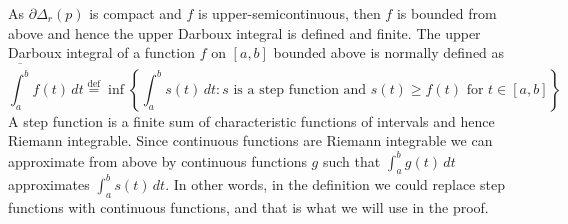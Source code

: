 \documentclass[12pt,openany]{book}
\theoremstyle{plain}
\theoremstyle{remark}
\theoremstyle{definition}
\theoremstyle{exercise}
\theoremstyle{example}
\begin{document}
As $\partial \Delta_r(p)$ is compact and $f$ is upper-semicontinuous, then
$f$ is bounded from above and hence the upper Darboux integral is defined
and finite.
The upper Darboux integral of a function $f$ on $[a,b]$ bounded above is normally defined as
\begin{equation*}
\overline{\int_a^b} f(t) \,dt
\overset{\text{def}}{=}
\inf \left\{ \int_a^b s(t) \, dt : s
\text{ is a step function and } s(t) \geq f(t) \text{ for } t \in
[a,b] \right\}
\end{equation*}
A step function is a finite sum of characteristic functions of intervals and
hence Riemann integrable.
Since continuous functions are Riemann integrable we can approximate from
above by continuous functions $g$ such that
$\int_a^b g(t)\,dt$
approximates
$\int_a^b s(t)\,dt$.  In other words, in the definition we could replace
step functions with continuous functions, and that is what we will use in
the proof.
\end{document}
